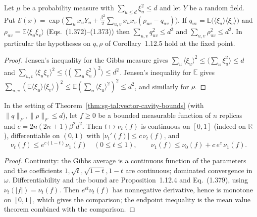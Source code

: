 \begin{theorem}\label{thm:sg-tal:vector-fixed-point-bounds}
\leanok
{}
Let $\mu$ be a probability measure with $\sum_{u\le d}\xi_u^2\le d$ and let $Y$ be a random field. Put $\mathcal E(x)=\exp\bigl(\sum_ux_uY_u+\frac{\beta^2}2\sum_{u,v}x_ux_v(\rho_{uv}-q_{uv})\bigr)$. If $q_{uv}=\mathbb E\bigl(\langle\xi_u\rangle\langle\xi_v\rangle\bigr)$ and $\rho_{uv}=\mathbb E\langle\xi_u\xi_v\rangle$ (Eqs.~(1.372)--(1.373)) then $\sum_{u,v}q_{uv}^2\le d^2$ and $\sum_{u,v}\rho_{uv}^2\le d^2$. In particular the hypotheses on $q,\rho$ of Corollary~1.12.5 hold at the fixed point.
\end{theorem}
\begin{proof}
\leanok
Jensen's inequality for the Gibbs measure gives $\sum_u\langle\xi_u\rangle^2\le\langle\sum_u\xi_u^2\rangle\le d$ and $\sum_{u,v}\langle\xi_u\xi_v\rangle^2\le\langle(\sum_u\xi_u^2)^2\rangle\le d^2$. Jensen's inequality for $\mathbb E$ gives $\sum_{u,v}(\mathbb E\langle\xi_u\rangle\langle\xi_v\rangle)^2\le\mathbb E(\sum_u\langle\xi_u\rangle^2)^2\le d^2$, and similarly for $\rho$.
\end{proof}

\begin{theorem}\label{thm:sg-tal:vector-comparison}
\leanok
{}
In the setting of Theorem~\ref{thm:sg-tal:vector-cavity-bounds} (with $\|q\|_F,\|\rho\|_F\le d$), let $f\ge0$ be a bounded measurable function of $n$ replicas and $c=2n(2n+1)\beta^2d^2$. Then $t\mapsto\nu_t(f)$ is continuous on $[0,1]$ (indeed on $\mathbb R$), differentiable on $(0,1)$ with $|\nu_t'(f)|\le c\,\nu_t(f)$, and
\[
\nu_t(f)\le e^{c(1-t)}\nu_1(f)\quad(0\le t\le1),\qquad \nu_1(f)\le\nu_0(f)+c\,e^{c}\,\nu_1(f).
\]
\end{theorem}
\begin{proof}
\leanok
Continuity: the Gibbs average is a continuous function of the parameters and the coefficients $1,\sqrt t,\sqrt{1-t},1-t$ are continuous; dominated convergence in $\omega$. Differentiability and the bound are Proposition~1.12.4 and Eq.~(1.379), using $\nu_t(|f|)=\nu_t(f)$. Then $e^{ct}\nu_t(f)$ has nonnegative derivative, hence is monotone on $[0,1]$, which gives the comparison; the endpoint inequality is the mean value theorem combined with the comparison.
\end{proof}

